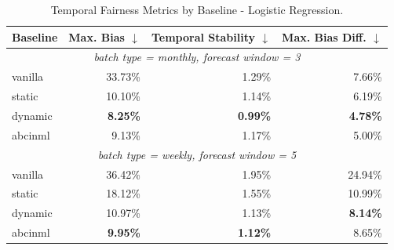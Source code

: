 \begin{table}
  \caption{Temporal Fairness Metrics by Baseline - Logistic Regression.}
  \label{tab:temporal-lr}
  \begin{tabular}{lrrr}
    \toprule
    Baseline & Max. Bias $\downarrow$ & Temporal Stability $\downarrow$ & Max. Bias Diff. $\downarrow$ \\
    \midrule
    \multicolumn{4}{c}{\textit{batch type = monthly, forecast window = 3}} \\
    \midrule
    vanilla & 33.73\% & 1.29\% & 7.66\% \\
    static & 10.10\% & 1.14\% & 6.19\% \\
    dynamic & \textbf{8.25\%} & \textbf{0.99\%} & \textbf{4.78\%} \\
    abcinml & 9.13\% & 1.17\% & 5.00\% \\
    \midrule
    \multicolumn{4}{c}{\textit{batch type = weekly, forecast window = 5}} \\
    \midrule
    vanilla & 36.42\% & 1.95\% & 24.94\% \\
    static & 18.12\% & 1.55\% & 10.99\% \\
    dynamic & 10.97\% & 1.13\% & \textbf{8.14\%} \\
    abcinml & \textbf{9.95\%} & \textbf{1.12\%} & 8.65\% \\
    \bottomrule
  \end{tabular}
\end{table}
